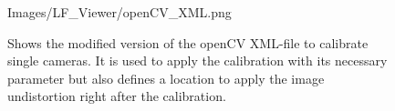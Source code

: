 \begin{figure}[htb]
	\begin{minipage}[h]{\textwidth}
		\centering
		\begin{overpic}[width=0.9\linewidth]{Images/LF_Viewer/openCV_XML.png}
		\end{overpic}
	\end{minipage}
	\caption{Shows the modified version of the openCV XML-file to calibrate single cameras. It is used to apply the calibration with its necessary parameter but also defines a location to apply the image undistortion right after the calibration.}
	\label{figure_openCV_XML}
\end{figure}
